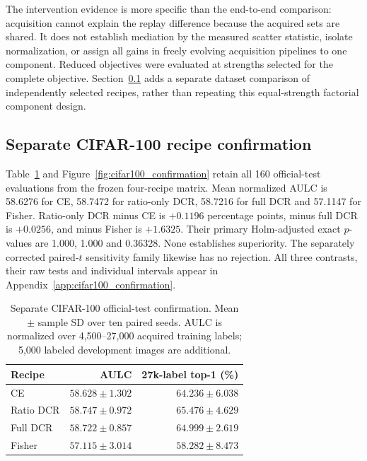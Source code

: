 \documentclass[10pt,a4paper,twocolumn]{article}
\begin{document}
The intervention evidence is more specific than the end-to-end
comparison: acquisition cannot explain the replay difference because
the acquired sets are shared. It does not establish mediation by the
measured scatter statistic, isolate normalization, or assign all gains
in freely evolving acquisition pipelines to one component. Reduced
objectives were evaluated at strengths selected for the complete
objective. Section~\ref{sec:cifar100_results} adds a separate dataset
comparison of independently selected recipes, rather than repeating
this equal-strength factorial component design.

\subsection{Separate CIFAR-100 recipe confirmation}
\label{sec:cifar100_results}

Table~\ref{tab:cifar100_summary} and Figure~\ref{fig:cifar100_confirmation}
retain all 160 official-test evaluations from the frozen four-recipe
matrix. Mean normalized AULC is 58.6276 for CE, 58.7472 for ratio-only
DCR, 58.7216 for full DCR and 57.1147 for Fisher. Ratio-only DCR minus
CE is $+0.1196$ percentage points, minus full DCR is $+0.0256$, and
minus Fisher is $+1.6325$. Their primary Holm-adjusted exact
$p$-values are 1.000, 1.000 and 0.36328. None establishes superiority.
The separately corrected paired-$t$ sensitivity family likewise has no
rejection. All three contrasts, their raw tests and individual intervals
appear in Appendix~\ref{app:cifar100_confirmation}.

\begin{table}[tbp]
\centering\footnotesize
\setlength{\tabcolsep}{2pt}
\caption{Separate CIFAR-100 official-test confirmation. Mean $\pm$ sample SD over ten paired seeds. AULC is normalized over 4,500--27,000 acquired training labels; 5,000 labeled development images are additional.}
\label{tab:cifar100_summary}
\begin{tabular*}{\linewidth}{@{\extracolsep{\fill}}lrr@{}}
\toprule
Recipe & AULC & 27k-label top-1 (\%) \\
\midrule
CE & $58.628\pm1.302$ & $64.236\pm6.038$ \\
Ratio DCR & $58.747\pm0.972$ & $65.476\pm4.629$ \\
Full DCR & $58.722\pm0.857$ & $64.999\pm2.619$ \\
Fisher & $57.115\pm3.014$ & $58.282\pm8.473$ \\
\bottomrule
\end{tabular*}
\end{table}
\end{document}
